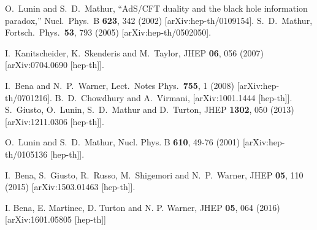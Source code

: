 \documentclass[11pt]{article}
\begin{document}
\begin{thebibliography}{99}

O.~Lunin and S.~D.~Mathur,
  ``AdS/CFT duality and the black hole information paradox,''
  Nucl.\ Phys.\  B {\bf 623}, 342 (2002)
  [arXiv:hep-th/0109154].
 S.~D.~Mathur,
  Fortsch.\ Phys.\  {\bf 53}, 793 (2005)
  [arXiv:hep-th/0502050].

I.~Kanitscheider, K.~Skenderis and M.~Taylor,
JHEP \textbf{06}, 056 (2007)
[arXiv:0704.0690 [hep-th]].

 I.~Bena and N.~P.~Warner,
  Lect.\ Notes Phys.\  {\bf 755}, 1 (2008)
  [arXiv:hep-th/0701216].
 B.~D.~Chowdhury and A.~Virmani,
  [arXiv:1001.1444 [hep-th]].
 S.~Giusto, O.~Lunin, S.~D.~Mathur and D.~Turton,
JHEP {\bf 1302}, 050 (2013)
[arXiv:1211.0306 [hep-th]].
  
O.~Lunin and S.~D.~Mathur,
Nucl. Phys. B \textbf{610}, 49-76 (2001)
[arXiv:hep-th/0105136 [hep-th]].


I.~Bena, S.~Giusto, R.~Russo, M.~Shigemori and N.~P.~Warner,
JHEP \textbf{05}, 110 (2015)
[arXiv:1503.01463 [hep-th]].
   

I. Bena, E. Martinec, D. Turton and N. P. Warner, JHEP {\bf 05}, 064 (2016) 
[arXiv:1601.05805 [hep-th]]


\end{thebibliography}
\end{document}
